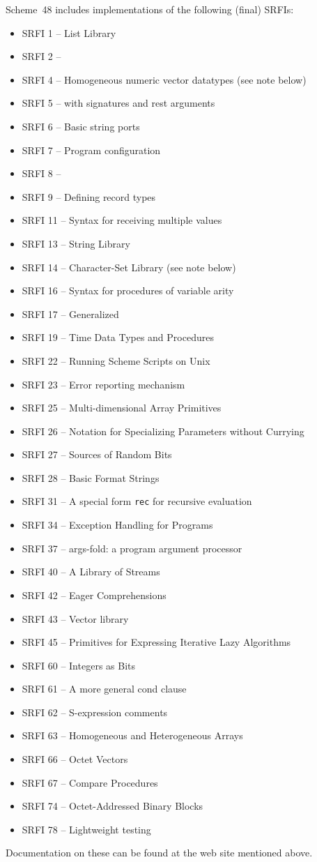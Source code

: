 Scheme~48 includes implementations of the following (final) SRFIs:
\begin{itemize}
\item SRFI 1 -- List Library
\item SRFI 2 -- 
\item SRFI 4 -- Homogeneous numeric vector datatypes (see note below)
\item SRFI 5 --  with signatures and rest arguments
\item SRFI 6 -- Basic string ports
\item SRFI 7 -- Program configuration
\item SRFI 8 -- 
\item SRFI 9 -- Defining record types
\item SRFI 11 -- Syntax for receiving multiple values 
\item SRFI 13 -- String Library
\item SRFI 14 -- Character-Set Library (see note below)
\item SRFI 16 -- Syntax for procedures of variable arity
\item SRFI 17 -- Generalized 
\item SRFI 19 -- Time Data Types and Procedures
\item SRFI 22 -- Running Scheme Scripts on Unix
\item SRFI 23 -- Error reporting mechanism
\item SRFI 25 -- Multi-dimensional Array Primitives 
\item SRFI 26 -- Notation for Specializing Parameters without Currying
\item SRFI 27 -- Sources of Random Bits
\item SRFI 28 -- Basic Format Strings
\item SRFI 31 -- A special form \texttt{rec} for recursive evaluation
\item SRFI 34 -- Exception Handling for Programs
\item SRFI 37 -- args-fold: a program argument processor
\item SRFI 40 -- A Library of Streams
\item SRFI 42 -- Eager Comprehensions
\item SRFI 43 -- Vector library
\item SRFI 45 -- Primitives for Expressing Iterative Lazy Algorithms
\item SRFI 60 -- Integers as Bits
\item SRFI 61 -- A more general cond clause
\item SRFI 62 -- S-expression comments
\item SRFI 63 -- Homogeneous and Heterogeneous Arrays
\item SRFI 66 -- Octet Vectors
\item SRFI 67 -- Compare Procedures
\item SRFI 74 -- Octet-Addressed Binary Blocks
\item SRFI 78 -- Lightweight testing
\end{itemize}
Documentation on these can be found at the web site mentioned above.

